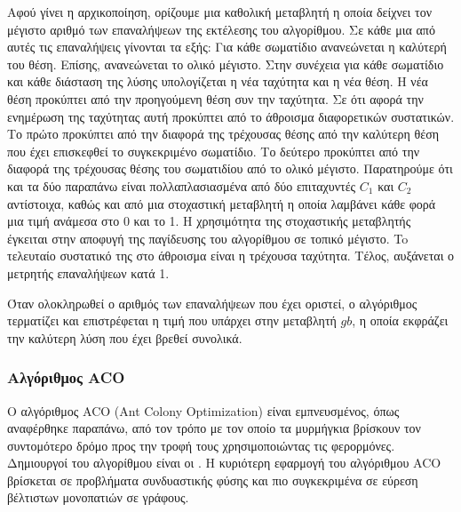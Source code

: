 \documentclass{assignment}
\begin{document}
Αφού γίνει η αρχικοποίηση, ορίζουμε μια καθολική μεταβλητή η οποία δείχνει τον
μέγιστο αριθμό των επαναλήψεων της εκτέλεσης του αλγορίθμου. Σε κάθε μια από
αυτές τις επαναλήψεις γίνονται τα εξής: Για κάθε σωματίδιο ανανεώνεται
η καλύτερή του θέση. Επίσης, ανανεώνεται το ολικό μέγιστο. Στην συνέχεια για
κάθε σωματίδιο και κάθε διάσταση της λύσης υπολογίζεται η νέα ταχύτητα και
η νέα θέση. Η νέα θέση προκύπτει από την προηγούμενη θέση συν την ταχύτητα. Σε
ότι αφορά την ενημέρωση της ταχύτητας αυτή προκύπτει από το άθροισμα
διαφορετικών συστατικών. Το πρώτο προκύπτει από την διαφορά της τρέχουσας θέσης
από την καλύτερη θέση που έχει επισκεφθεί το συγκεκριμένο σωματίδιο. Το δεύτερο
προκύπτει από την διαφορά της τρέχουσας θέσης του σωματιδίου από το ολικό
μέγιστο. Παρατηρούμε ότι και τα δύο παραπάνω είναι πολλαπλασιασμένα από δύο
επιταχυντές $C_1$ και $C_2$ αντίστοιχα, καθώς και από μια στοχαστική μεταβλητή
η οποία λαμβάνει κάθε φορά μια τιμή ανάμεσα στο 0 και το 1. Η χρησιμότητα
της στοχαστικής μεταβλητής έγκειται στην αποφυγή της παγίδευσης του αλγορίθμου
σε τοπικό μέγιστο. To τελευταίο συστατικό της στο άθροισμα είναι η τρέχουσα
ταχύτητα. Τέλος, αυξάνεται ο μετρητής επαναλήψεων κατά 1.

Όταν ολοκληρωθεί ο αριθμός των επαναλήψεων που έχει οριστεί, ο αλγόριθμος
τερματίζει και επιστρέφεται η τιμή που υπάρχει στην μεταβλητή $gb$, η οποία
εκφράζει την καλύτερη λύση που έχει βρεθεί συνολικά.
\subsubsection*{Αλγόριθμος ACO}
Ο αλγόριθμος ACO (Ant Colony Optimization) είναι εμπνευσμένος, όπως αναφέρθηκε
παραπάνω, από τον τρόπο με τον οποίο τα μυρμήγκια βρίσκουν τον συντομότερο δρόμο
προς την τροφή τους χρησιμοποιώντας τις φερορμόνες. Δημιουργοί του αλγορίθμου
είναι οι \citet{dorigo2010ant}. H κυριότερη εφαρμογή του αλγόριθμου ACO
βρίσκεται σε προβλήματα συνδυαστικής φύσης και πιο συγκεκριμένα σε εύρεση
βέλτιστων μονοπατιών σε γράφους.
\end{document}
